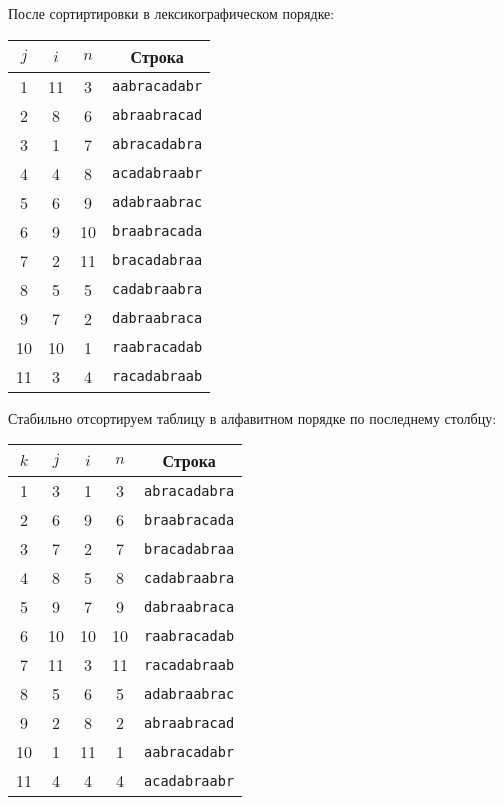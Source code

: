 \documentclass[12pt,a4paper]{article}
\begin{document}
    После сортиртировки в лексикографическом порядке:
    \begin{center}
        \begin{tabular}{c|c|c|c}
            $j$ & $i$ & $n$ & Строка \\ \hline
            1   & 11  & 3   & \texttt{aabracadabr} \\
            2   & 8   & 6   & \texttt{abraabracad} \\
            3   & 1   & 7   & \texttt{abracadabra} \\
            4   & 4   & 8   & \texttt{acadabraabr} \\
            5   & 6   & 9   & \texttt{adabraabrac} \\
            6   & 9   & 10  & \texttt{braabracada} \\
            7   & 2   & 11  & \texttt{bracadabraa} \\
            8   & 5   & 5   & \texttt{cadabraabra} \\
            9   & 7   & 2   & \texttt{dabraabraca} \\
            10  & 10  & 1   & \texttt{raabracadab} \\
            11  & 3   & 4   & \texttt{racadabraab} \\
        \end{tabular}
    \end{center}
    \bigskip

    Стабильно отсортируем таблицу в алфавитном порядке по последнему столбцу:
    \begin{center}
        \begin{tabular}{c|c|c|c|c}
            $k$ & $j$ & $i$ & $n$ & Строка \\ \hline
            1   & 3   & 1   & 3   & \texttt{abracadabra} \\
            2   & 6   & 9   & 6   & \texttt{braabracada} \\
            3   & 7   & 2   & 7   & \texttt{bracadabraa} \\
            4   & 8   & 5   & 8   & \texttt{cadabraabra} \\
            5   & 9   & 7   & 9   & \texttt{dabraabraca} \\
            6   & 10  & 10  & 10  & \texttt{raabracadab} \\
            7   & 11  & 3   & 11  & \texttt{racadabraab} \\
            8   & 5   & 6   & 5   & \texttt{adabraabrac} \\
            9   & 2   & 8   & 2   & \texttt{abraabracad} \\
            10  & 1   & 11  & 1   & \texttt{aabracadabr} \\
            11  & 4   & 4   & 4   & \texttt{acadabraabr} \\
        \end{tabular}
    \end{center}
    \bigskip
\end{document}
